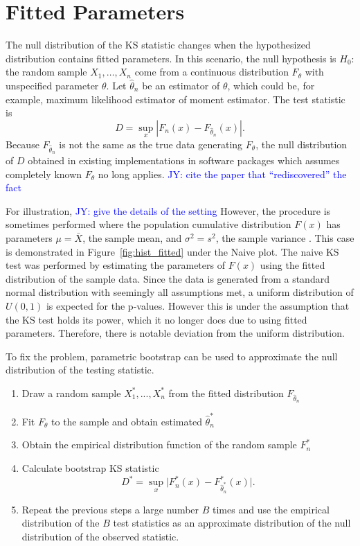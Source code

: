 \documentclass[12pt, letterpaper, titlepage]{article}
\newcommand{\jy}[1]{\textcolor{blue}{JY: #1}}
\begin{document}
\section{Fitted Parameters}\label{sec:fitted}

The null distribution of the KS statistic changes when the hypothesized
distribution contains fitted parameters. In this scenario, the null hypothesis
is $H_0$: the random sample $X_1, \ldots, X_n$ come from a continuous
distribution $F_{\theta}$ with unspecified parameter $\theta$.
Let $\hat\theta_n$ be an estimator of $\theta$, which could be, for example,
maximum likelihood estimator of moment estimator. The test statistic is
\begin{equation}
  \label{eq:ks_fitted}
  D = \sup_x | F_n(x) - F_{\hat\theta_n}(x) |.
\end{equation}
Because $F_{\hat\theta_n}$ is not the same as the true data generating
$F_\theta$, the null distribution of $D$ obtained in existing implementations in
software packages which assumes completely known $F_\theta$ no long applies.
\jy{cite the paper that ``rediscovered'' the fact}


For illustration, \jy{give the details of the setting}
However, the procedure is sometimes performed where the population cumulative 
distribution $F(x)$ has parameters $\mu=\bar X$, the sample mean, and $\sigma^2=s^2$, 
the sample variance \citep{Lilliefors}. This case is demonstrated in Figure~\ref{fig:hist_fitted} 
under the Naive plot. The naive KS test was performed by estimating the parameters 
of $F(x)$ using the fitted distribution of the sample data. Since the data is generated 
from a standard normal distribution with seemingly all assumptions met, a uniform 
distribution of $U(0,1)$ is expected for the p-values. However this is under the 
assumption that the KS test holds its power, which it no longer does due to using 
fitted parameters. Therefore, there is notable deviation from the uniform distribution. 


To fix the problem, parametric bootstrap can be used to approximate the null
distribution of the testing statistic. 
\begin{enumerate}
  \item 
    Draw a random sample $X_1^*,...,X_n^*$ from the fitted distribution $F_{\hat\theta_n}$
  \item 
    Fit $F_\theta$ to the sample and obtain estimated $\hat\theta_n^*$
  \item
    Obtain the empirical distribution function of the random sample $F_n^*$
  \item 
    Calculate bootstrap KS statistic
    \[
      D^* = \sup_x \lvert F_n^* (x)- F_{\hat\theta_n^*}^*(x) \rvert.
    \]
  \item
    Repeat the previous steps a large number $B$ times and use the empirical
    distribution of the $B$ test statistics as an approximate distribution of
    the null distribution of the observed statistic.      
\end{enumerate}
\end{document}
